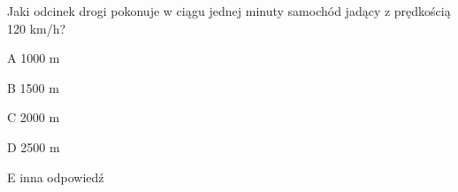 \begin{tresc}
Jaki odcinek drogi pokonuje w ciągu jednej minuty samochód jadący z prędkością 120 km/h?
\end{tresc}
\begin{wariant}{A} 1000 m \end{wariant}
\begin{wariant}{B} 1500 m \end{wariant}
\begin{wariant}{C} 2000 m \end{wariant}
\begin{wariant}{D} 2500 m \end{wariant}
\begin{wariant}{E} inna odpowiedź \end{wariant}
